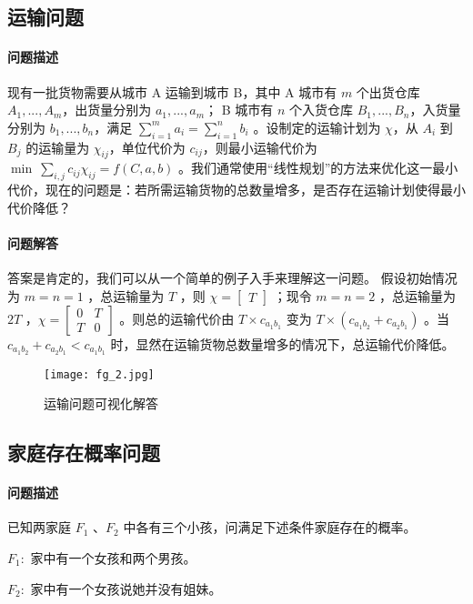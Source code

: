 	\subsection{运输问题}
		\paragraph{问题描述}
			现有一批货物需要从城市 A 运输到城市 B，其中 A 城市有 $m$ 个出货仓库 $A_1,...,A_m$，出货量分别为 $a_1,...,a_m$； B 城市有 $n$ 个入货仓库 $B_1,...,B_n$，入货量分别为 $b_1,...,b_n$，满足 $	\sum_{i=1}^{m}a_i = \sum_{i=1}^{n}b_i  $ 。设制定的运输计划为 $\chi$，从 $A_i$ 到 $B_j$ 的运输量为 $\chi_{ij}$，单位代价为 $c_{ij}$，则最小运输代价为 $\min \ \sum_{i,j} c_{ij} \chi_{ij} = f(C,a,b) $
			。我们通常使用“线性规划”的方法来优化这一最小代价，现在的问题是：若所需运输货物的总数量增多，是否存在运输计划使得最小代价降低？

		\paragraph{问题解答}
			答案是肯定的，我们可以从一个简单的例子入手来理解这一问题。
			\proof
			假设初始情况为 $m=n=1$ ，总运输量为 $T$ ，则 $\chi = \left[ \begin{array}{c}
					T
			\end{array} \right] $ ；现令 $m=n=2$ ，总运输量为 $2T$ ，$\chi =
				\left[ \begin{array}{cc}
					0 & T\\
					T & 0
				\end{array} \right] $ 。则总的运输代价由 $ T \times c_{a_1 b_1} $ 变为 $ T \times (c_{a_1 b_2} + c_{a_2 b_1}) $ 。当 $ c_{a_1 b_2} + c_{a_2 b_1} < c_{a_1 b_1} $ 时，显然在运输货物总数量增多的情况下，总运输代价降低。
				\begin{figure}[htbp]
					\centering
					\texttt{[image: fg\_2.jpg]}
					\caption{运输问题可视化解答}
					\label{fig: 运输问题可视化解答}
				\end{figure}
	\subsection{家庭存在概率问题}
		\paragraph{问题描述}
			已知两家庭 $ F_1 $ 、$ F_2 $ 中各有三个小孩，问满足下述条件家庭存在的概率。
			\par  $ F_1: $ 家中有一个女孩和两个男孩。
			\par  $ F_2: $ 家中有一个女孩说她并没有姐妹。

